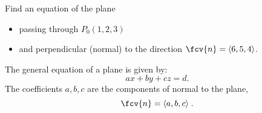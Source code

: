 \begin{frame}
\begin{example}
Find an equation of the plane
\begin{itemize}
\item passing through $P_0(1,2,3)$ 
\item and perpendicular (normal) to the direction $ \fcv{n} = \langle 6,5,4\rangle$.
\end{itemize}
%

\end{example}
\pause The general equation of a plane is given by:
%
$$ax+by+cz = d .$$
%
The coefficients $a,b,c$ are \pause the components of normal to the plane,
%
$$ \fcv{n} = \langle a,b,c\rangle\; .$$

\end{frame}